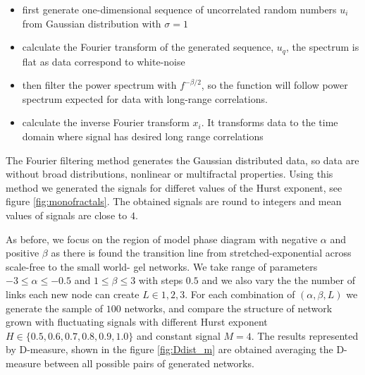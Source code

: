 \begin{itemize}
	\item first generate one-dimensional sequence of uncorrelated random numbers $u_i$ from Gaussian distribution with $\sigma=1$
	\item calculate the Fourier transform of the generated sequence, $u_q$, the spectrum is flat as data correspond to white-noise
	\item then filter the power spectrum with $f^{-\beta/2}$, so the function will follow power spectrum expected for data with long-range correlations. 	
	\item  calculate the inverse Fourier transform $x_i$. It transforms data to the time domain where signal has desired long range correlations 
	 
\end{itemize}     

The Fourier filtering method generates the Gaussian distributed data, so data are without broad distributions, nonlinear or multifractal properties. Using this method we generated the signals for differet values of the Hurst exponent, see figure \ref{fig:monofractals}. The obtained signals are round to integers and mean values of signals are close to $4$.






As before, we focus on the region of model phase diagram with negative $\alpha$ and positive $\beta$ as there is found the transition line from stretched-exponential across scale-free to the small world- gel networks. We take range of parameters  $-3\leq\alpha\leq-0.5$ and $1\leq\beta\leq3$ with steps $0.5$ and we also vary the the number of links each new node can create $L\in{1, 2, 3}$. For each combination of $(\alpha, \beta, L)$ we generate the sample of $100$ networks, and compare the structure of network grown with fluctuating signals with different Hurst exponent $H \in \{0.5, 0.6, 0.7, 0.8, 0.9, 1.0\}$ and constant signal $M=4$. The results represented by D-measure, shown in the figure \ref{fig:Ddist_m}  are obtained averaging the D-measure between all possible pairs of generated networks.   

